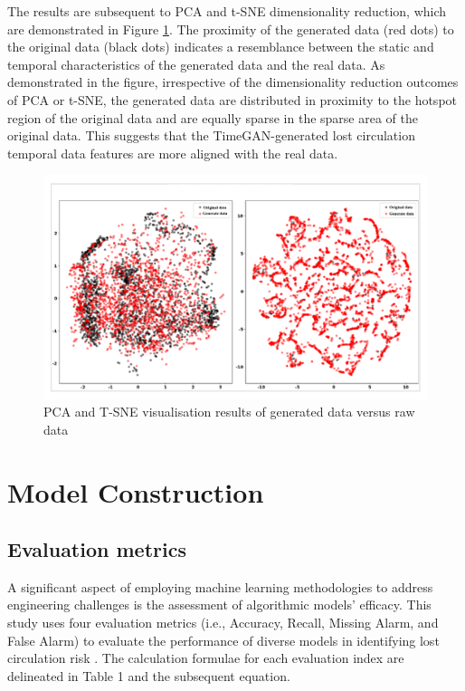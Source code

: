 \documentclass[journal,article,submit,pdftex,moreauthors]{Definitions/mdpi}
\begin{document}
The results are subsequent to PCA and t-SNE dimensionality reduction, which are demonstrated in Figure \ref{fig:PCA and TSNE visualisation results of generated data versus raw data}. The proximity of the generated data (red dots) to the original data (black dots) indicates a resemblance between the static and temporal characteristics of the generated data and the real data. As demonstrated in the figure, irrespective of the dimensionality reduction outcomes of PCA or t-SNE, the generated data are distributed in proximity to the hotspot region of the original data and are equally sparse in the sparse area of the original data. This suggests that the TimeGAN-generated lost circulation temporal data features are more aligned with the real data.
\begin{figure}[H]
    \centering
    \includegraphics[width=0.95\linewidth]{图片/pca tsne.png}
    \caption{PCA and T-SNE visualisation results of generated data versus raw data}
    \label{fig:PCA and TSNE visualisation results of generated data versus raw data}
\end{figure}



\section{Model Construction}
\subsection{Evaluation metrics}

A significant aspect of employing machine learning methodologies to address engineering challenges is the assessment of algorithmic models' efficacy. This study uses four evaluation metrics (i.e., Accuracy, Recall, Missing Alarm, and False Alarm\cite{SunW2023}) to evaluate the performance of diverse models in identifying lost circulation risk \cite{ZZY2024}. The calculation formulae for each evaluation index are delineated in Table 1 and the subsequent equation.
\end{document}
